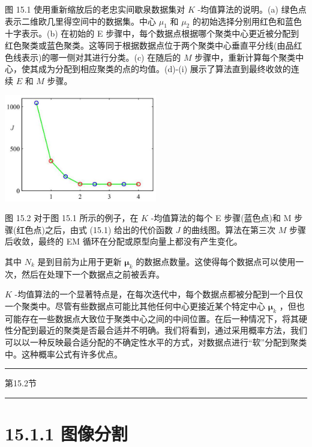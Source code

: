 \documentclass[10pt]{report}
\newcommand{\HRule}{\begin{center}\rule{0.9\linewidth}{0.2mm}\end{center}}
\begin{document}
图 15.1 使用重新缩放后的老忠实间歇泉数据集对 \(K\) -均值算法的说明。(a) 绿色点表示二维欧几里得空间中的数据集。中心 \({\mu }_{1}\) 和 \({\mu }_{2}\) 的初始选择分别用红色和蓝色十字表示。(b) 在初始的 E 步骤中，每个数据点根据哪个聚类中心更近被分配到红色聚类或蓝色聚类。这等同于根据数据点位于两个聚类中心垂直平分线(由品红色线表示)的哪一侧对其进行分类。(c) 在随后的 \(M\) 步骤中，重新计算每个聚类中心，使其成为分配到相应聚类的点的均值。(d)-(i) 展示了算法直到最终收敛的连续 \(E\) 和 \(M\) 步骤。

\begin{center}
\includegraphics[max width=0.5\textwidth]{images/0194e279-9b28-703a-88f4-c3ac21e2010d_483_916_354_629_440_0.jpg}
\end{center}
\hspace*{3em} 

图 15.2 对于图 15.1 所示的例子，在 \(K\) -均值算法的每个 E 步骤(蓝色点)和 M 步骤(红色点)之后，由式 (15.1) 给出的代价函数 \(J\) 的曲线图。算法在第三次 \(M\) 步骤后收敛，最终的 EM 循环在分配或原型向量上都没有产生变化。

其中 \({N}_{k}\) 是到目前为止用于更新 \({\mathbf{\mu }}_{k}\) 的数据点数量。这使得每个数据点可以使用一次，然后在处理下一个数据点之前被丢弃。

\(K\) -均值算法的一个显著特点是，在每次迭代中，每个数据点都被分配到一个且仅一个聚类中。尽管有些数据点可能比其他任何中心更接近某个特定中心 \({\mathbf{\mu }}_{k}\) ，但也可能存在一些数据点大致位于聚类中心之间的中间位置。在后一种情况下，将其硬性分配到最近的聚类是否最合适并不明确。我们将看到，通过采用概率方法，我们可以以一种反映最合适分配的不确定性水平的方式，对数据点进行“软”分配到聚类中。这种概率公式有许多优点。

\HRule

第15.2节

\HRule

\section*{15.1.1 图像分割}
\end{document}
